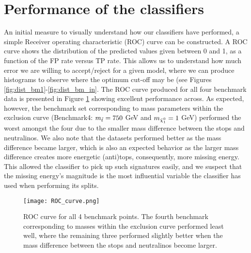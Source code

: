 
\section{Performance of the classifiers}
An initial measure to visually understand how our classifiers have performed, a simple Receiver operating characteristic (ROC) curve can be constructed. A ROC curve shows the distribution of the predicted values given between 0 and 1, as a function of the FP rate versus TP rate. This allows us to understand how much error we are willing to accept/reject for a given model, where we can produce histograms to observe where the optimum cut-off may be (see Figures \ref{fig:dist_bm1}-\ref{fig:dist_bm_in}. The ROC curve produced for all four benchmark data is presented in Figure \ref{fig:ROC} showing excellent performance across. As expected, however, the benchmark set corresponding to mass parameters within the exclusion curve (Benchmark4: $m_{\Tilde{t}} = 750$ GeV and $m_{\Tilde{\chi}_1^0} = 1$ GeV) performed the worst amongst the four due to the smaller mass difference between the stops and neutralinos. We also note that the datasets performed better as the mass difference became larger, which is also an expected behavior as the larger mass difference creates more energetic (anti)tops, consequently, more missing energy. This allowed the classifier to pick up such signatures easily, and we suspect that the missing energy's magnitude is the most influential variable the classifier has used when performing its splits. \\


\begin{figure}[htbp]
    \centering
    \texttt{[image: ROC\_curve.png]}
    \caption{ROC curve for all 4 benchmark points. The fourth benchmark corresponding to masses within the exclusion curve performed least well, where the remaining three performed slightly better when the mass difference between the stops and neutralinos become larger.}
    \label{fig:ROC}
\end{figure} 

